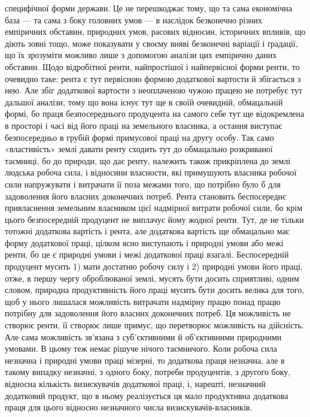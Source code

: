 \parcont{}  %
специфічної форми держави. Це не перешкоджає тому, що та сама економічна
база — та сама з боку головних умов — в наслідок безконечно різних емпіричних
обставин, природних умов, расових відносин, історичних впливів, що діють
зовні тощо, може показувати у своєму вияві безконечні варіації і ґрадації, що
їх зрозуміти можливо лише з допомогою аналізи цих емпірично даних обставин.
Щодо відробітної ренти, найпростішої і найпервісної форми ренти, то очевидно
таке: рента є тут первісною формою додаткової вартости й збігається з
нею. Але збіг додаткової вартости з неоплаченою чужою працею не потребує
тут дальшої аналізи, тому що вона існує тут ще в своїй очевидній, обмацальній
формі, бо праця безпосереднього продуцента на самого себе тут ще відокремлена
в просторі і часі від його праці на земельного власника, а остання виступає
безпосередньо в грубій формі примусової праці на другу особу. Так само «властивість»
землі давати ренту сходить тут до обмацально розкриваної таємниці, бо до
природи, що дає ренту, належить також прикріплена до землі людська робоча сила,
і відносини власности, які примушують власника робочої сили напружувати і витрачати
її поза межами того, що потрібно було б для задоволення його власних
доконечних потреб. Рента становить беспосереднє привласнення земельним
власником цієї надмірної витрати робочої сили, бо крім цього безпосередній
продуцент не виплачує йому жодної ренти. Тут, де не тільки тотожні додаткова
вартість і рента, але додаткова вартість ще обмацально має форму додаткової праці,
цілком ясно виступають і природні умови або межі ренти, бо це є природні
умови і межі додаткової праці взагалі. Беспосередній продуцент
мусить 1) мати достатню робочу силу і 2) природні умови його праці, отже,
в першу чергу оброблюваної землі, мусять бути досить сприятливі, одним
словом, природна продуктивність його праці мусить бути досить велика для
того, щоб у нього лишалася можливість витрачати надмірну працю понад працю
потрібну для задоволення його власних доконечних потреб. Ця можливість не
створює ренти, її створює лише примус, що перетворює можливість на дійсність.
Але сама можливість зв’язана з суб’єктивними й об’єктивними природними
умовами. В цьому теж немає рішуче нічого таємничого. Коли робоча сила незначна
і природні умови праці мізерні, то додаткова праця незначна, але в
такому випадку незначні, з одного боку, потреби продуцентів, з другого боку,
відносна кількість визискувачів додаткової праці, і, нарешті, незначний додатковий
продукт, що в ньому реалізується ця мало продуктивна додаткова праця для
цього відносно незначного числа визискувачів-власників.

